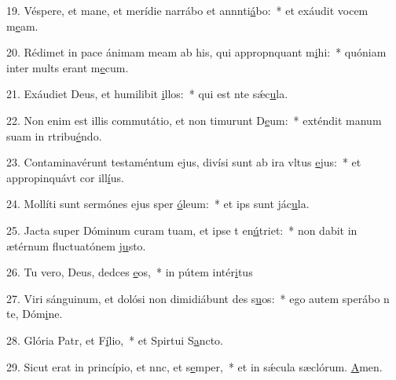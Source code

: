 19. Véspere, et mane, et merídie narrábo et annnti\uline{á}bo:~* et exáudit vocem m\uline{e}am.\par 
20. Rédimet in pace ánimam meam ab his, qui appropnquant m\uline{i}hi:~* quóniam inter mults erant m\uline{e}cum.\par 
21. Exáudiet Deus, et humilibit \uline{i}llos:~* qui est nte sǽc\uline{u}la.\par 
22. Non enim est illis commutátio, et non timurunt D\uline{e}um:~* exténdit manum suam in rtribu\uline{é}ndo.\par 
23. Contaminavérunt testaméntum ejus, divísi sunt ab ira vltus \uline{e}jus:~* et appropinquávt cor ill\uline{í}us.\par 
24. Mollíti sunt sermónes ejus sper \uline{ó}leum:~* et ips sunt jác\uline{u}la.\par 
25. Jacta super Dóminum curam tuam, et ipse t en\uline{ú}triet:~* non dabit in ætérnum fluctuatónem j\uline{u}sto.\par 
26. Tu vero, Deus, dedces \uline{e}os,~* in pútem intér\uline{i}tus\par 
27. Viri sánguinum, et dolósi non dimidiábunt des s\uline{u}os:~* ego autem sperábo n te, Dóm\uline{i}ne.\par 
28. Glória Patr, et F\uline{í}lio,~* et Spirtui S\uline{a}ncto.\par 
29. Sicut erat in princípio, et nnc, et s\uline{e}mper,~* et in sǽcula sæclórum. \uline{A}men.\par 
